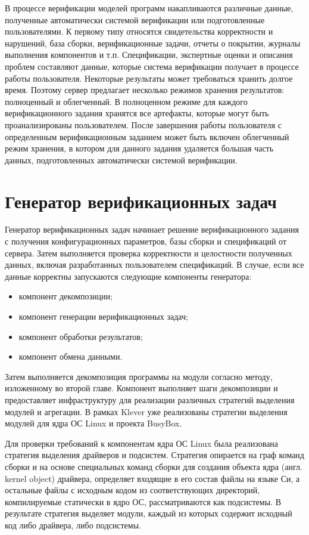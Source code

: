 В процессе верификации моделей программ накапливаются различные данные, полученные автоматически системой верификации или подготовленные пользователями. 
К первому типу относятся свидетельства корректности и нарушений, база сборки, верификационные задачи, отчеты о покрытии, журналы выполнения компонентов и т.п.
Спецификации, экспертные оценки и описания проблем составляют данные, которые система верификации получает в процессе работы пользователя.
Некоторые результаты может требоваться хранить долгое время.
Поэтому сервер предлагает несколько режимов хранения результатов: полноценный и облегченный.
В полноценном режиме для каждого верификационного задания хранятся все артефакты, которые могут быть проанализированы пользователем.
После завершения работы пользователя с определенным верификационным заданием может быть включен облегченный режим хранения, в котором для данного задания удаляется большая часть данных, подготовленных автоматически системой верификации.

\section{Генератор верификационных задач}
Генератор верификационных задач начинает решение верификационного задания с получения конфигурационных параметров, базы сборки и спецификаций от сервера.
Затем выполняется проверка корректности и целостности полученных данных, включая разработанных пользователем спецификаций.
В случае, если все данные корректны запускаются следующие компоненты генератора:
\begin{itemize}
    \item компонент декомпозиции;
    \item компонент генерации верификационных задач;
    \item компонент обработки результатов;
    \item компонент обмена данными.
\end{itemize}

Затем выполняется декомпозиция программы на модули согласно методу, изложенному во второй главе.
Компонент выполняет шаги декомпозиции и предоставляет инфраструктуру для реализации различных стратегий выделения модулей и агрегации.
В рамках Klever уже реализованы стратегии выделения модулей для ядра ОС Linux и проекта BusyBox.

Для проверки требований к компонентам ядра ОС Linux была реализована стратегия выделения драйверов и подсистем.
Стратегия опирается на граф команд сборки и на основе специальных команд сборки для создания объекта ядра (англ. kernel object) драйвера, определяет входящие в его состав файлы на языке Си, а остальные файлы с исходным кодом из соответствующих директорий, компилируемые статически в ядро ОС, рассматриваются как подсистемы.
В результате стратегия выделяет модули, каждый из которых содержит исходный код либо драйвера, либо подсистемы.

